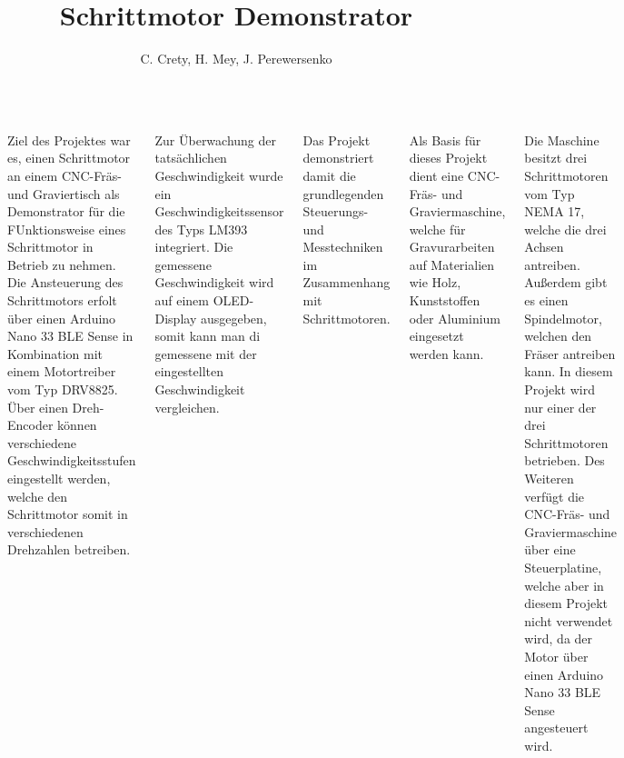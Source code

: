 \documentclass[25pt,a0paper, portrait]{tikzposter}
\title{Schrittmotor Demonstrator}
\author{C. Crety, H. Mey, J. Perewersenko}
\begin{document}
 
\maketitle

\begin{columns} 
	
	{
		{
			Ziel des Projektes war es, einen Schrittmotor an einem CNC-Fräs- und Graviertisch als Demonstrator für die FUnktionsweise eines Schrittmotor in Betrieb zu nehmen. Die Ansteuerung des Schrittmotors erfolt über einen Arduino Nano 33 BLE Sense in Kombination mit einem Motortreiber vom Typ DRV8825. Über einen Dreh-Encoder können verschiedene Geschwindigkeitsstufen eingestellt werden, welche den Schrittmotor somit in verschiedenen Drehzahlen betreiben. 
			
			Zur Überwachung der tatsächlichen Geschwindigkeit wurde ein Geschwindigkeitssensor des Typs LM393 integriert. Die gemessene Geschwindigkeit wird auf einem OLED-Display ausgegeben, somit kann man di gemessene mit der eingestellten Geschwindigkeit vergleichen. 
			
			Das Projekt demonstriert damit die grundlegenden Steuerungs- und Messtechniken im Zusammenhang mit Schrittmotoren.
		}
		{
			Als Basis für dieses Projekt dient eine CNC-Fräs- und Graviermaschine, welche für Gravurarbeiten auf Materialien wie Holz, Kunststoffen oder Aluminium eingesetzt werden kann. 
			
			Die Maschine besitzt drei Schrittmotoren vom Typ NEMA 17, welche die drei Achsen antreiben. Außerdem gibt es einen Spindelmotor, welchen den Fräser antreiben kann. In diesem Projekt wird nur einer der drei Schrittmotoren betrieben. Des Weiteren verfügt die CNC-Fräs- und Graviermaschine über eine Steuerplatine, welche aber in diesem Projekt nicht verwendet wird, da der Motor über einen Arduino Nano 33 BLE Sense angesteuert wird.
		}
	}


	{
		{

}}
\end{columns}
\end{document}
